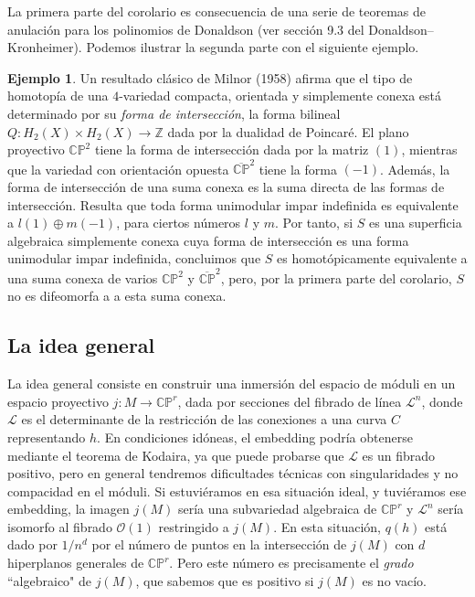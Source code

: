 \documentclass[12pt, a4paper]{amsart}
\newcommand\CC{\mathbb{C}}
\newcommand\PP{\mathbb{P}}
\newcommand\LL{\mathscr{L}}
\newcommand\OO{\mathscr{O}}
\theoremstyle{remark} \newtheorem{rmk}[thm]{Observación}
\theoremstyle{remark} \newtheorem{rmks}[thm]{Observaciones}
\theoremstyle{definition} \newtheorem{defn}[thm]{Definición}
\theoremstyle{definition} \newtheorem{ejs}[thm]{Ejemplos}
\theoremstyle{definition} \newtheorem{ej}[thm]{Ejemplo}
\begin{document}
	La primera parte del corolario es consecuencia de una serie de teoremas de anulación para los polinomios de Donaldson (ver sección 9.3 del Donaldson--Kronheimer). Podemos ilustrar la segunda parte con el siguiente ejemplo.

	\begin{ej}
		Un resultado clásico de Milnor (1958) afirma que el tipo de homotopía de una $4$-variedad compacta, orientada y simplemente conexa está determinado por su \emph{forma de intersección}, la forma bilineal $Q:H_2(X)\times H_2(X)\rightarrow \mathbb{Z}$ dada por la dualidad de Poincaré. El plano proyectivo $\CC\PP^2$ tiene la forma de intersección dada por la matriz $(1)$, mientras que la variedad con orientación opuesta $\overline{\CC\PP}^2$ tiene la forma $(-1)$. Además, la forma de intersección de una suma conexa es la suma directa de las formas de intersección. Resulta que toda forma unimodular impar indefinida es equivalente a $l(1)\oplus m(-1)$, para ciertos números $l$ y $m$. Por tanto, si $S$ es una superficia algebraica simplemente conexa cuya forma de intersección es una forma unimodular impar indefinida, concluimos que $S$ es homotópicamente equivalente a una suma conexa de varios $\CC\PP^2$ y  $\overline{\CC\PP}^2$, pero, por la primera parte del corolario, $S$ no es difeomorfa a a esta suma conexa.
	\end{ej}

	\subsection{La idea general}
	La idea general consiste en construir una inmersión del espacio de móduli en un espacio proyectivo $j:M\rightarrow \CC\PP^r$, dada por secciones del fibrado de línea $\LL^n$, donde $\LL$ es el determinante de la restricción de las conexiones a una curva $C$ representando $h$. En condiciones idóneas, el embedding podría obtenerse mediante el teorema de Kodaira, ya que puede probarse que $\LL$ es un fibrado positivo, pero en general tendremos dificultades técnicas con singularidades y no compacidad en el móduli. Si estuviéramos en esa situación ideal, y tuviéramos ese embedding, la imagen $j(M)$ sería una subvariedad algebraica de $\CC\PP^r$ y $\LL^n$ sería isomorfo al fibrado $\OO(1)$ restringido a $j(M)$. En esta situación, $q(h)$ está dado por $1/n^d$ por el número de puntos en la intersección de $j(M)$ con $d$ hiperplanos generales de $\CC\PP^r$. Pero este número es precisamente el \emph{grado} ``algebraico" de $j(M)$, que sabemos que es positivo si $j(M)$ es no vacío.
\end{document}
